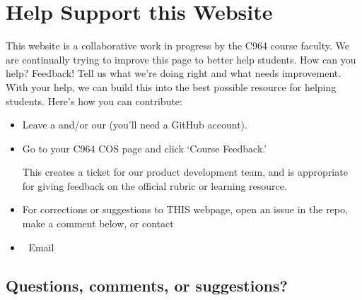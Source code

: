 \documentclass[letterpaper,10pt,english]{jupyterBook}
\begin{document}
\chapter{Help Support this Website}
\label{\detokenize{support_this_page:help-support-this-website}}\label{\detokenize{support_this_page::doc}}
\sphinxAtStartPar
This website is a collaborative work in progress by the C964 course faculty. We are continually trying to improve this page to better help students. How can you help? Feedback! Tell us what we’re doing right and what needs improvement. With your help, we can build this into the best possible resource for helping students. Here’s how you can contribute:
\begin{itemize}
\item {} 
\sphinxAtStartPar
Leave a {\hyperref[\detokenize{support_this_page:support-comments}]{}} and/or our  (you’ll need a GitHub account).

\item {} 
\sphinxAtStartPar
Go to your C964 COS page and click ‘Course Feedback.’
\begin{quote}


\end{quote}

\sphinxAtStartPar
This creates a ticket for our product development team, and is appropriate for giving feedback on the official rubric or learning resource.

\item {} 
\sphinxAtStartPar
For corrections or suggestions to THIS webpage, open an issue in the repo, make a comment below, or contact 

\item {} 
\sphinxAtStartPar
📧 Email 

\end{itemize}


\section{Questions, comments, or suggestions?}
\label{\detokenize{support_this_page:questions-comments-or-suggestions}}\label{\detokenize{support_this_page:support-comments}}
\end{document}
